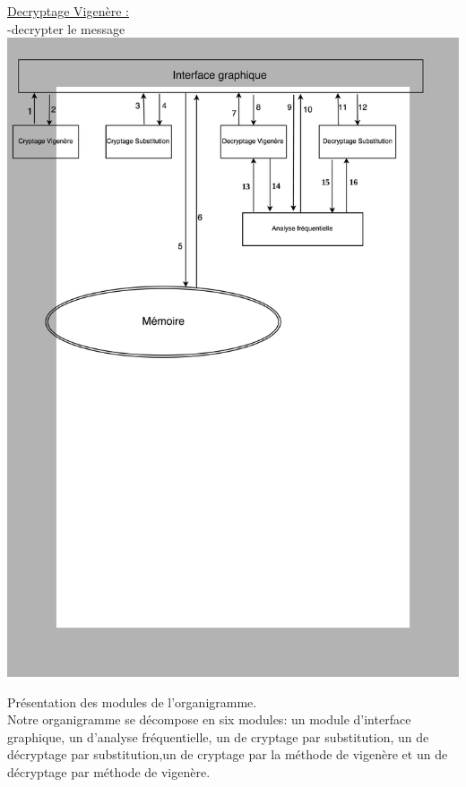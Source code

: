 \documentclass[a4]{article}
\begin{document}
			\underline{Decryptage Vigenère :}\\
			-decrypter le message\\
			
			
%
\includegraphics[scale=0.9]{organigramme_rapport.jpg}



Présentation des modules de l'organigramme. \\

	Notre organigramme se décompose en six modules: un module d'interface graphique, un d'analyse fréquentielle, un de cryptage 
  par substitution, un de décryptage par substitution,un de cryptage par la méthode de vigenère et un de décryptage par méthode 
  de vigenère. \\
\end{document}

